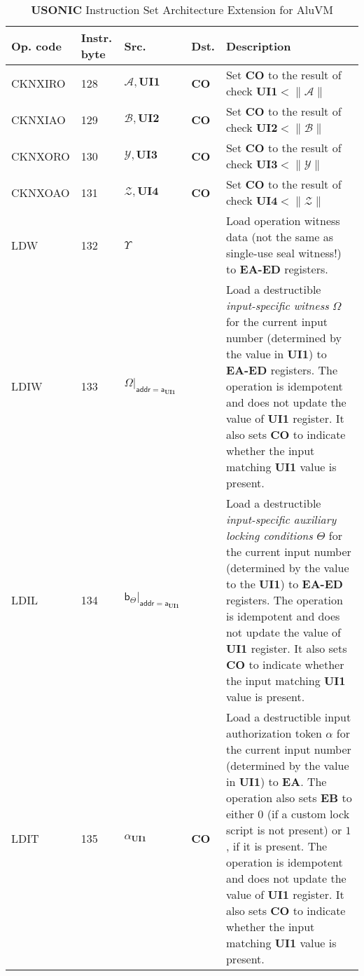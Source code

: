 \documentclass[9pt,oneside]{amsart}
\begin{document}
\begin{table}[h]
\centering
\caption{\textbf{USONIC} Instruction Set Architecture Extension for AluVM}\label{tab:usonic}
\begin{tabular}{l p{1cm} l p{1.5cm} p{9.3cm}}
\toprule
Op. code & Instr. byte & Src. & Dst. & Description \\
\midrule
CKNXIRO	&128	&$\mathcal{A}, \mathbf{UI1}$	&\textbf{CO}	&Set \textbf{CO} to the result of check $\mathbf{UI1} < \| \mathcal{A} \|$ \\ \midrule
CKNXIAO	&129	&$\mathcal{B}, \mathbf{UI2}$	&\textbf{CO}	&Set \textbf{CO} to the result of check $\mathbf{UI2} < \| \mathcal{B} \|$ \\ \midrule
CKNXORO	&130	&$\mathcal{Y}, \mathbf{UI3}$	&\textbf{CO}	&Set \textbf{CO} to the result of check $\mathbf{UI3} < \| \mathcal{Y} \|$ \\ \midrule
CKNXOAO	&131	&$\mathcal{Z}, \mathbf{UI4}$	&\textbf{CO}	&Set \textbf{CO} to the result of check $\mathbf{UI4} < \| \mathcal{Z} \|$ \\ \midrule
LDW	    &132	&$\Upsilon$	                    &              	&Load operation witness data (not the same as single-use seal witness!) to \textbf{EA-ED} registers. \\ \midrule
LDIW	&133	&$\Omega|_{\mathsf{addr} = \mathsf{a}_\mathbf{UI1}}$	&	&Load a destructible \emph{input-specific witness} $\Omega$ for the current input number (determined by the value in \textbf{UI1}) to \textbf{EA-ED} registers.
The operation is idempotent and does not update the value of \textbf{UI1} register. It also sets \textbf{CO} to indicate whether the input matching \textbf{UI1} value is present. \\ \midrule
LDIL	&134	&$\mathsf{b}_\Theta|_{\mathsf{addr} = \mathsf{a}_\mathbf{UI1}}$	&	&Load a destructible \emph{input-specific auxiliary locking conditions} $\Theta$ for the current input number (determined by the value to the \textbf{UI1}) to \textbf{EA-ED} registers.
The operation is idempotent and does not update the value of \textbf{UI1} register. It also sets \textbf{CO} to indicate whether the input matching \textbf{UI1} value is present. \\ \midrule
LDIT	&135	&$\alpha_\mathbf{UI1}$	        &\textbf{CO}	&Load a destructible input authorization token $\alpha$ for the current input number (determined by the value in \textbf{UI1}) to \textbf{EA}. The operation also sets \textbf{EB} to either $0$ (if a custom lock script is not present) or $1$, if it is present.
The operation is idempotent and does not update the value of \textbf{UI1} register. It also sets \textbf{CO} to indicate whether the input matching \textbf{UI1} value is present. \\ \midrule

\end{tabular}
\end{table}
\end{document}
